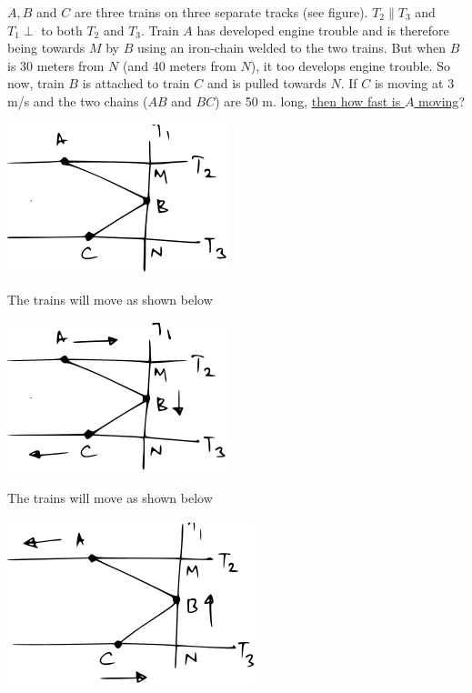\documentclass[14pt,fleqn]{extarticle}
\begin{document}
\begin{problem}
\statement
	

    $A, B$ and $C$ are three trains on three separate
    tracks (see figure). $T_2\parallel T_3$ and  $T_1\perp$ to both
    $T_2$ and $T_3$. Train $A$ has developed engine trouble 
    and is therefore being towards $M$ by $B$ using
    an iron-chain welded to the two trains. But 
    when $B$ is 30 meters from $N$ (and 40 meters 
    from $N$), it too develops engine trouble. So
    now, train $B$ is attached to train $C$ and is pulled
    towards $N$. If $C$ is moving at 3 m/s and the two
    chains ($AB$ and $BC$) are 50 m. long, 
    \underline{then how fast is $A$ moving}?
    
    \begin{center}
\includegraphics[scale=1.8]{333-A.svg}
\end{center}
    
\begin{step}
	\begin{options}
	
	\correct 
	
	The trains will move as shown below 
	\begin{center}
\includegraphics[scale=1.5]{333-B.svg}
\end{center}

	\incorrect 
	
	The trains will move as shown below 
	\begin{center}
\includegraphics[scale=1.5]{333-C.svg}
\end{center}
	

\end{options}
\end{step}
\end{problem}
\end{document}

